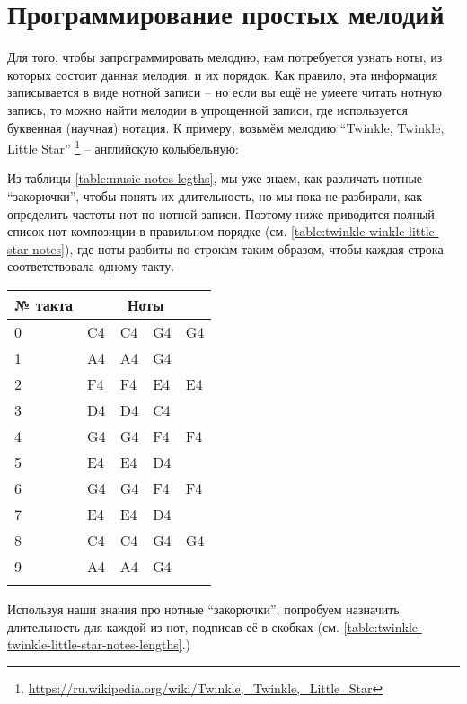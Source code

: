 \documentclass[../sparc.tex]{subfiles}
\begin{document}
\section{Программирование простых мелодий}

Для того, чтобы запрограммировать мелодию, нам потребуется узнать ноты, из
которых состоит данная мелодия, и их порядок. Как правило, эта информация
записывается в виде нотной записи -- но если вы ещё не умеете читать нотную
запись, то можно найти мелодии в упрощенной записи, где используется буквенная
(научная) нотация. К примеру, возьмём мелодию ``Twinkle, Twinkle, Little
Star'' \footnote{\url{https://ru.wikipedia.org/wiki/Twinkle,_Twinkle,_Little_Star}}
-- английскую колыбельную:


Из таблицы \ref{table:music-notes-legths}, мы уже знаем, как различать нотные
``закорючки'', чтобы понять их длительность, но мы пока не разбирали, как
определить частоты нот по нотной записи. Поэтому ниже приводится полный список
нот композиции в правильном порядке (см.
\ref{table:twinkle-winkle-little-star-notes}), где ноты разбиты по строкам
таким образом, чтобы каждая строка соответствовала одному такту.

\begin{tabular}{p{2cm}|p{2cm}|p{2cm}|p{2cm}|p{2cm}}
  № такта & \multicolumn{4}{c}{Ноты} \\
  \hline \hline
  0 & C4 & C4 & G4 & G4 \\
  \hline
  1 & A4 & A4 & G4 & \\
  \hline
  2 & F4 & F4 & E4 & E4 \\
  \hline
  3 & D4 & D4 & C4 & \\
  \hline
  4 & G4 & G4 & F4 & F4 \\
  \hline
  5 & E4 & E4 & D4 & \\
  \hline
  6 & G4 & G4 & F4 & F4 \\
  \hline
  7 & E4 & E4 & D4 & \\
  \hline
  8 & C4 & C4 & G4 & G4 \\
  \hline
  9 & A4 & A4 & G4 & \\
  \hline
  \label{table:twinkle-twinkle-little-star-notes}
\end{tabular}

Используя наши знания про нотные ``закорючки'', попробуем назначить длительность
для каждой из нот, подписав её в скобках
(см. \ref{table:twinkle-twinkle-little-star-notes-lengths}.)
\end{document}
